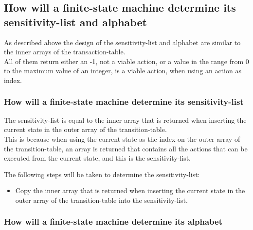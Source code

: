 \hypertarget{how-will-a-finite-state-machine-determine-its-sensitivity-list-and-alphabet}{%
\subsection{How will a finite-state machine determine its
sensitivity-list and
alphabet}\label{how-will-a-finite-state-machine-determine-its-sensitivity-list-and-alphabet}}

As described above the design of the sensitivity-list and alphabet are
similar to the inner arrays of the transaction-table.\\
All of them return either an -1, not a viable action, or a value in the
range from 0 to the maximum value of an integer, is a viable action,
when using an action as index.

\hypertarget{how-will-a-finite-state-machine-determine-its-sensitivity-list}{%
\subsubsection{How will a finite-state machine determine its
sensitivity-list}\label{how-will-a-finite-state-machine-determine-its-sensitivity-list}}

The sensitivity-list is equal to the inner array that is returned when
inserting the current state in the outer array of the
transition-table.\\
This is because when using the current state as the index on the outer
array of the transition-table, an array is returned that contains all
the actions that can be executed from the current state, and this is the
sensitivity-list.

The following steps will be taken to determine the sensitivity-list:

\begin{itemize}
\tightlist
\item
  Copy the inner array that is returned when inserting the current state
  in the outer array of the transition-table into the sensitivity-list.
\end{itemize}

\hypertarget{how-will-a-finite-state-machine-determine-its-alphabet}{%
\subsubsection{How will a finite-state machine determine its
alphabet}\label{how-will-a-finite-state-machine-determine-its-alphabet}}

